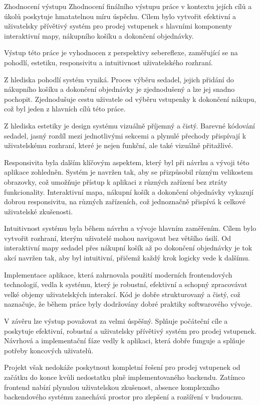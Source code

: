 \begin{section}{Zhodnocení výstupu}
    \label{sec:zaver-zhodnoceni}
    Zhodnocení finálního výstupu práce v kontextu jejích cílů a úkolů poskytuje hmatatelnou míru úspěchu.
    Cílem bylo vytvořit efektivní a uživatelsky přívětivý systém pro prodej vstupenek s hlavními komponenty interaktivní mapy, nákupního košíku a dokončení objednávky.

    Výstup této práce je vyhodnocen z perspektivy sebereflexe, zaměřující se na pohodlí, estetiku, responsivitu a intuitivnost uživatelského rozhraní.


    Z hlediska pohodlí systém vyniká.
    Proces výběru sedadel, jejich přidání do nákupního košíku a dokončení objednávky je zjednodušený a lze jej snadno pochopit.
    Zjednodušuje cestu uživatele od výběru vstupenky k dokončení nákupu, což byl jeden z hlavních cílů této práce.

    Z hlediska estetiky je design systému vizuálně příjemný a čistý.
    Barevné kódování sedadel, jasný rozdíl mezi jednotlivými sekcemi a plynulé přechody přispívají k uživatelskému rozhraní, které je nejen funkční, ale také vizuálně přitažlivé.

    Responsivita byla dalším klíčovým aspektem, který byl při návrhu a vývoji této aplikace zohledněn.
    Systém je navržen tak, aby se přizpůsobil různým velikostem obrazovky, což umožňuje přístup k aplikaci z různých zařízení bez ztráty funkcionality.
    Interaktivní mapa, nákupní košík a dokončení objednávky vykazují dobrou responsivitu, na různých zařízeních, což jednoznačně přispívá k celkové uživatelské zkušenosti.

    Intuitivnost systému byla během návrhu a vývoje hlavním zaměřením.
    Cílem bylo vytvořit rozhraní, kterým uživatelé mohou navigovat bez většího úsilí.
    Od interaktivní mapy sedadel přes nákupní košík až po dokončení objednávky je tok akcí navržen tak, aby byl intuitivní, přičemž každý krok logicky vede k dalšímu.

    Implementace aplikace, která zahrnovala použití moderních frontendových technologií, vedla k systému, který je robustní, efektivní a schopný zpracovávat velké objemy uživatelských interakcí.
    Kód je dobře strukturovaný a čistý, což naznačuje, že během práce byly dodržovány dobré praktiky softwarového vývoje.

    V závěru lze výstup považovat za velmi úspěšný.
    Splňuje počáteční cíle a poskytuje efektivní, robustní a uživatelsky přívětivý systém pro prodej vstupenek.
    Návrhová a implementační fáze vedly k aplikaci, která dobře funguje a splňuje potřeby koncových uživatelů.

    Projekt však nedokáže poskytnout kompletní řešení pro prodej vstupenek od začátku do konce kvůli nedostatku plně implementovaného backendu.
    Zatímco frontend nabízí plynulou uživatelskou zkušenost, absence komplexního backendového systému zanechává prostor pro zlepšení a rozšíření v budoucnu.
\end{section}

